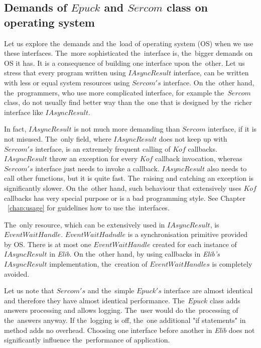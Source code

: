   \subsection*{Demands of $Epuck$ and $Sercom$ class on operating system} 
  Let us explore the~demands and the~load of operating system (OS) when we use these interfaces.
  The~more sophisticated the~interface is, the~bigger demands on OS it has.
  It is a consequence of building one interface upon the~other.
  Let us stress that every program written using $IAsyncResult$ interface, 
  can be written with less or equal system resources using $Sercom's$
  interface. On the~other hand, the~programmers, 
  who use more complicated interface, for example the~$Sercom$ class, do not usually find better way 
  than the~one that is designed by the~richer interface like $IAsyncResult$.

  In fact, $IAsyncResult$ is not much more demanding than $Sercom$ interface, if it is not misused.
  The~only field, where $IAsyncResult$ does not keep up with $Sercom's$ interface, 
  is an extremely frequent calling of $Kof$ callbacks.
  $IAsyncResult$ throw an exception for every $Kof$ callback invocation, 
  whereas $Sercom's$ interface just needs to invoke a callback.
  $IAsyncResult$ also needs to call other functions, but it is quite fast. 
  The~raising and catching an exception is significantly slower.
  On the~other hand, such behaviour that extensively uses $Kof$ callbacks 
  has very special purpose or is a bad programming style.
  See Chapter ~\ref{chap:usage} for guidelines how to use the~interfaces.

  The~only resource, which can be extensively used in $IAsyncResult$, is $EventWaitHandle$. 
  $EventWaitHadndle$ is a synchronisation primitive provided
  by OS. There is at most one $EventWaitHandle$ created for each instance of $IAsyncResult$ in {\it Elib}. 
  On the~other hand, by using callbacks in {\it Elib's} $IAsyncResult$
  implementation, the~creation of $EventWaitHandles$ is completely avoided.

  Let us note that $Sercom's$ and the~simple $Epuck's$ interface 
  are almost identical and therefore they have almost identical performance.
  The~$Epuck$ class adds answers processing and allows logging. The~user would do the~processing of the~answers anyway.
  If the~logging is off, the~one additional "if statements" in method adds no overhead. 
  Choosing one interface before another in {\it Elib} does not significantly influence the~performance of application.

